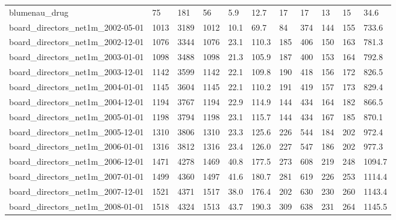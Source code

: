 \begin{longtable}{lllllllllll}
 blumenau\_drug                                      & 75         & 181       & 56    & 5.9    & 12.7   & 17    & 17     & 13     & 15     & 34.6    \\
 board\_directors\_net1m\_2002-05-01                   & 1013       & 3189      & 1012  & 10.1   & 69.7   & 84    & 374    & 144    & 155    & 733.6   \\
 board\_directors\_net1m\_2002-12-01                   & 1076       & 3344      & 1076  & 23.1   & 110.3  & 185   & 406    & 150    & 163    & 781.3   \\
 board\_directors\_net1m\_2003-01-01                   & 1098       & 3488      & 1098  & 21.3   & 105.9  & 187   & 400    & 153    & 164    & 792.8   \\
 board\_directors\_net1m\_2003-12-01                   & 1142       & 3599      & 1142  & 22.1   & 109.8  & 190   & 418    & 156    & 172    & 826.5   \\
 board\_directors\_net1m\_2004-01-01                   & 1145       & 3604      & 1145  & 22.1   & 110.2  & 191   & 419    & 157    & 173    & 829.4   \\
 board\_directors\_net1m\_2004-12-01                   & 1194       & 3767      & 1194  & 22.9   & 114.9  & 144   & 434    & 164    & 182    & 866.5   \\
 board\_directors\_net1m\_2005-01-01                   & 1198       & 3794      & 1198  & 23.1   & 115.7  & 144   & 434    & 167    & 185    & 870.1   \\
 board\_directors\_net1m\_2005-12-01                   & 1310       & 3806      & 1310  & 23.3   & 125.6  & 226   & 544    & 184    & 202    & 972.4   \\
 board\_directors\_net1m\_2006-01-01                   & 1316       & 3812      & 1316  & 23.4   & 126.0  & 227   & 547    & 186    & 202    & 977.3   \\
 board\_directors\_net1m\_2006-12-01                   & 1471       & 4278      & 1469  & 40.8   & 177.5  & 273   & 608    & 219    & 248    & 1094.7  \\
 board\_directors\_net1m\_2007-01-01                   & 1499       & 4360      & 1497  & 41.6   & 180.7  & 281   & 619    & 226    & 253    & 1114.4  \\
 board\_directors\_net1m\_2007-12-01                   & 1521       & 4371      & 1517  & 38.0   & 176.4  & 202   & 630    & 230    & 260    & 1143.4  \\
 board\_directors\_net1m\_2008-01-01                   & 1518       & 4324      & 1513  & 43.7   & 190.3  & 309   & 638    & 231    & 264    & 1145.5  \\

\end{longtable}
